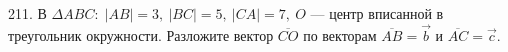 211. В $\Delta ABC:\; |AB| = 3,\ |BC| = 5,\ |CA| = 7,\ O$ --- центр вписанной в треугольник окружности. Разложите вектор $\overline{CO}$ по векторам
$\overline{AB}=\vec{b}$ и  $\overline{AC}=\vec{c}.$\\
